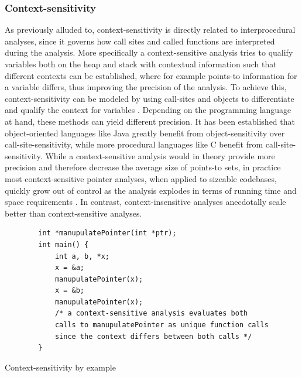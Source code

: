 \subsubsection{Context-sensitivity}
As previously alluded to, context-sensitivity is directly related to interprocedural analyses, since it governs how call sites and called functions are interpreted during the analysis.
More specifically a context-sensitive analysis tries to qualify variables both on the heap and stack with contextual information such that different contexts can be established, where for example points-to information for a variable differs, thus improving the precision of the analysis.
To achieve this, context-sensitivity can be modeled by using call-sites and objects to differentiate and qualify the context for variables \cite{smaragdakis2015pointer}. Depending on the programming language at hand, these methods can yield different precision. It has been established that object-oriented languages like Java greatly benefit from object-sensitivity over call-site-sensitivity, while more procedural languages like C benefit from call-site-sensitivity.
While a context-sensitive analysis would in theory provide more precision and therefore decrease the average size of points-to sets, in practice most context-sensitive pointer analyses, when applied to sizeable codebases, quickly grow out of control as the analysis explodes in terms of running time and space requirements \cite{smaragdakis2014introspective}. In contrast, context-insensitive analyses anecdotally scale better than context-sensitive analyses.

\begin{listing}
    \begin{verbatim}
        int *manupulatePointer(int *ptr);
        int main() {
            int a, b, *x;
            x = &a;
            manupulatePointer(x);
            x = &b;
            manupulatePointer(x);
            /* a context-sensitive analysis evaluates both
            calls to manupulatePointer as unique function calls
            since the context differs between both calls */
        }
    \end{verbatim}
    \caption{Context-sensitivity by example}
    \label{lst:contextsens}
\end{listing}

